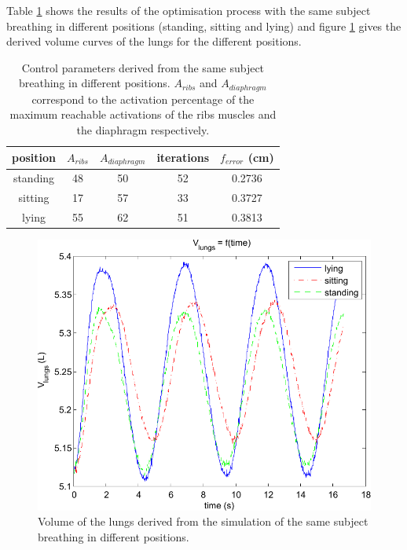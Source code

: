 Table \ref{tab:optim_pos} shows the results of the optimisation process with the same subject breathing in different positions (standing, sitting and lying) and figure \ref{fig:vlungs} gives the derived volume curves of the lungs for the different positions.

\begin{table}[h]
\begin{center}
\begin{tabular}{|c|c|c|c|c|}
\hline
position & $A_{ribs}$ & $A_{diaphragm}$ & iterations & $ f_{error} $ (cm)\\ 
\hline
\hline
 standing & 48 & 50 & 52 & 0.2736\\ 
 sitting & 17 & 57 & 33 & 0.3727\\ 
 lying & 55 & 62 & 51 & 0.3813\\ 
\hline
\end{tabular}
\end{center}
\caption[Control parameters derived from the same subject in different positions]{\label{tab:optim_pos}Control parameters derived from the same subject breathing in different positions. $A_{ribs}$ and $A_{diaphragm}$ correspond to the activation percentage of the maximum reachable activations of the ribs muscles and the diaphragm respectively.}
\end{table}

\begin{figure}
	\centering
	 \includegraphics[scale=1]{pics/vlungs}
	\caption[Simulated lungs' volume for the same subject breathing in different positions]{\label{fig:vlungs}Volume of the lungs derived from the simulation of the same subject breathing in different positions.}
\end{figure}